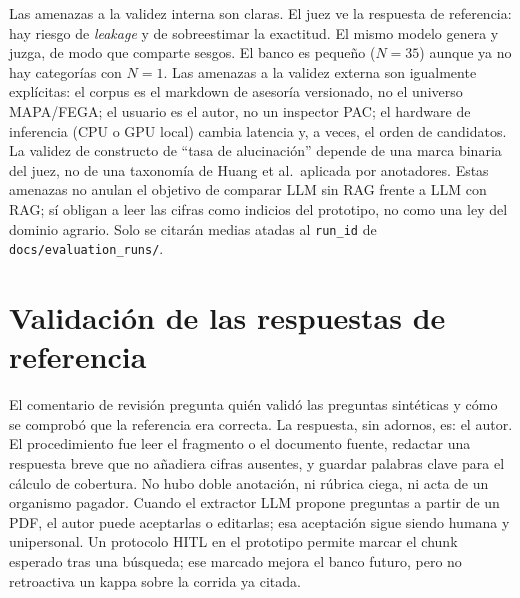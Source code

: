 Las amenazas a la validez interna son claras. El juez ve la respuesta de referencia: hay riesgo de \emph{leakage} y de sobreestimar la exactitud. El mismo modelo genera y juzga, de modo que comparte sesgos. El banco es pequeño ($N=35$) aunque ya no hay categorías con $N=1$. Las amenazas a la validez externa son igualmente explícitas: el corpus es el markdown de asesoría versionado, no el universo MAPA/FEGA; el usuario es el autor, no un inspector PAC; el hardware de inferencia (CPU o GPU local) cambia latencia y, a veces, el orden de candidatos. La validez de constructo de ``tasa de alucinación'' depende de una marca binaria del juez, no de una taxonomía de Huang et al.\ aplicada por anotadores. Estas amenazas no anulan el objetivo de comparar LLM sin RAG frente a LLM con RAG; sí obligan a leer las cifras como indicios del prototipo, no como una ley del dominio agrario. Solo se citarán medias atadas al \texttt{run\_id} de \texttt{docs/evaluation\_runs/}.

\section{Validación de las respuestas de referencia}
El comentario de revisión pregunta quién validó las preguntas sintéticas y cómo se comprobó que la referencia era correcta. La respuesta, sin adornos, es: el autor. El procedimiento fue leer el fragmento o el documento fuente, redactar una respuesta breve que no añadiera cifras ausentes, y guardar palabras clave para el cálculo de cobertura. No hubo doble anotación, ni rúbrica ciega, ni acta de un organismo pagador. Cuando el extractor LLM propone preguntas a partir de un PDF, el autor puede aceptarlas o editarlas; esa aceptación sigue siendo humana y unipersonal. Un protocolo HITL en el prototipo permite marcar el chunk esperado tras una búsqueda; ese marcado mejora el banco futuro, pero no retroactiva un kappa sobre la corrida ya citada.



